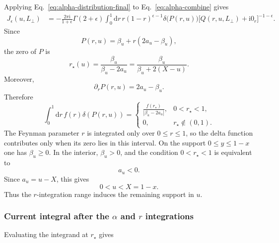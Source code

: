 \documentclass[11pt]{article}
\newcommand{\dd}{\mathrm d}
\newcommand{\ii}{\mathrm i}
\newcommand{\eps}{\epsilon}
\begin{document}
Applying Eq.~\eqref{eq:alpha-distribution-final} to Eq.~\eqref{eq:alpha-combine} gives
\begin{align}
J_\eps(u,L_\perp)
&=
-\frac{2\pi\ii}{1+\eps}\Gamma(2+\eps)
\int_0^1\dd r\,
 r(1-r)^{\eps-1}
\delta\!\bigl(P(r,u)\bigr)
\bigl[Q(r,u,L_\perp)+\ii0_r\bigr]^{-1-\eps}.
\label{eq:J-after-alpha}
\end{align}
Since
\begin{equation}
P(r,u)=\beta_u+r(2a_u-\beta_u),
\end{equation}
the zero of $P$ is
\begin{equation}
r_\star(u)=\frac{\beta_u}{\beta_u-2a_u}
=\frac{\beta_u}{\beta_u+2(X-u)}.
\label{eq:r-star}
\end{equation}
Moreover,
\begin{equation}
\partial_rP(r,u)=2a_u-\beta_u.
\end{equation}
Therefore
\begin{equation}
\int_0^1\dd r\,f(r)\delta(P(r,u))
=
\begin{cases}
\displaystyle \frac{f(r_\star)}{|\beta_u-2a_u|}, & 0<r_\star<1,\\[1.2em]
0, & r_\star\notin(0,1).
\end{cases}
\label{eq:r-delta-collapse}
\end{equation}
The Feynman parameter $r$ is integrated only over $0\le r\le1$, so the delta function contributes only when its zero lies in this interval.  On the support $0\le y\le1-x$ one has $\beta_u\ge0$.  In the interior, $\beta_u>0$, and the condition $0<r_\star<1$ is equivalent to
\begin{equation}
a_u<0.
\end{equation}
Since $a_u=u-X$, this gives
\begin{equation}
\boxed{0<u<X=1-x.}
\label{eq:u-support-corrected}
\end{equation}
Thus the $r$-integration range induces the remaining support in $u$.

\subsubsection{Current integral after the $\alpha$ and $r$ integrations}

Evaluating the integrand at $r_\star$ gives
\end{document}
